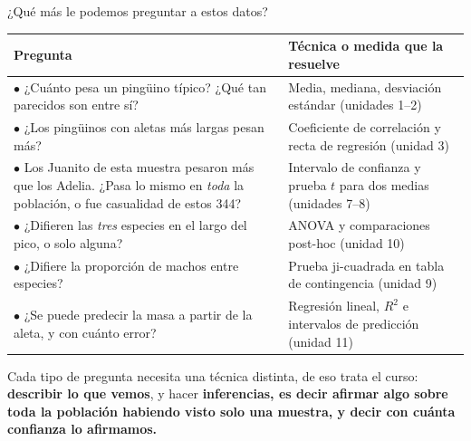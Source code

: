 \documentclass[aspectratio=169,10pt]{beamer}
\newcommand{\destaca}[1]{%
  \par\vspace{3pt}\noindent
  \colorbox{azulClaro}{%
    \parbox{\dimexpr\linewidth-2\fboxsep\relax}{\vspace{3pt}#1\vspace{3pt}}}%
  \par\vspace{3pt}}
\begin{document}
\begin{frame}{¿Qué más le podemos preguntar a estos datos?}
  \centering
  {\small
  \begin{tabular}{@{}p{7.2cm}p{4.8cm}@{}}
    \toprule
    \textbf{Pregunta} & \textbf{Técnica o medida que la resuelve} \\
    \midrule
    \textcolor[HTML]{1F4E79}{$\bullet$} ¿Cuánto pesa un pingüino típico? ¿Qué tan parecidos son entre sí? &
      Media, mediana, desviación estándar {\scriptsize\color{grisT}(unidades 1--2)} \\
    \textcolor[HTML]{1F4E79}{$\bullet$} ¿Los pingüinos con aletas más largas pesan más? &
      Coeficiente de correlación y recta de regresión {\scriptsize\color{grisT}(unidad 3)} \\
    \textcolor[HTML]{1F4E79}{$\bullet$} Los Juanito de esta muestra pesaron más que los Adelia. ¿Pasa lo mismo en \emph{toda} la población, o fue casualidad de estos 344? &
      Intervalo de confianza y prueba $t$ para dos medias {\scriptsize\color{grisT}(unidades 7--8)} \\
    \textcolor[HTML]{1F4E79}{$\bullet$} ¿Difieren las \emph{tres} especies en el largo del pico, o solo alguna? &
      ANOVA y comparaciones post-hoc {\scriptsize\color{grisT}(unidad 10)} \\
    \textcolor[HTML]{1F4E79}{$\bullet$} ¿Difiere la proporción de machos entre especies? &
      Prueba ji-cuadrada en tabla de contingencia {\scriptsize\color{grisT}(unidad 9)} \\
    \textcolor[HTML]{1F4E79}{$\bullet$} ¿Se puede predecir la masa a partir de la aleta, y con cuánto error? &
      Regresión lineal, $R^2$ e intervalos de predicción {\scriptsize\color{grisT}(unidad 11)} \\
    \bottomrule
  \end{tabular}}
  \vspace{2mm}
  \destaca{\small Cada tipo de pregunta necesita una técnica distinta, de eso trata el curso: \textbf{describir
  lo que vemos}, y hacer \textbf{inferencias, es decir afirmar algo sobre toda la población habiendo visto solo una muestra, y decir con cuánta confianza lo afirmamos.}}
\end{frame}
\end{document}
